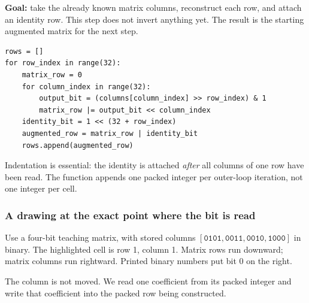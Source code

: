 \noindent\textbf{Goal:} take the already known matrix columns, reconstruct each
row, and attach an identity row. This step does not invert anything yet. The
result is the starting augmented matrix for the next step.

\begin{Verbatim}
rows = []
for row_index in range(32):
    matrix_row = 0
    for column_index in range(32):
        output_bit = (columns[column_index] >> row_index) & 1
        matrix_row |= output_bit << column_index
    identity_bit = 1 << (32 + row_index)
    augmented_row = matrix_row | identity_bit
    rows.append(augmented_row)
\end{Verbatim}
\noindent Indentation is essential: the identity is attached \emph{after} all
columns of one row have been read. The function appends one packed integer per
outer-loop iteration, not one integer per cell.

\subsubsection*{A drawing at the exact point where the bit is read}
Use a four-bit teaching matrix, with stored columns
$[\texttt{0101},\texttt{0011},\texttt{0010},\texttt{1000}]$ in binary.
The highlighted cell is row 1, column 1. Matrix rows run downward; matrix
columns run rightward. Printed binary numbers put bit 0 on the right.

\begin{center}
\end{center}
The column is not moved. We read one coefficient from its packed integer and
write that coefficient into the packed row being constructed.


